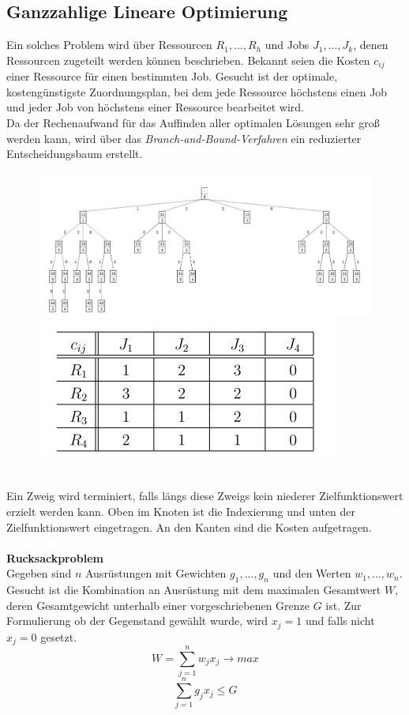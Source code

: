 	\subsection{Ganzzahlige Lineare Optimierung}
		Ein solches Problem wird über Ressourcen $ R_{1}, ...,R_{h} $ und Jobs $ J_{1}, ...,J_{k} $, denen Ressourcen zugeteilt werden können beschrieben. Bekannt seien die Kosten $ c_{ij} $ einer Ressource für einen bestimmten Job. Gesucht ist der optimale, kostengünstigste Zuordnungsplan, bei dem jede Ressource höchstens einen Job und jeder Job von höchstens einer Ressource bearbeitet wird. \\
		Da der Rechenaufwand für das Auffinden aller optimalen Lösungen sehr groß werden kann, wird über das \textit{Branch-and-Bound-Verfahren} ein reduzierter Entscheidungsbaum erstellt.
		\begin{figure}[h]
			\centering
			\includegraphics[width=0.7\linewidth]{./pics/ma/bnd} 
			\includegraphics[width=0.29\linewidth]{./pics/ma/bndt}
		\end{figure}
		\leavevmode \\
		Ein Zweig wird terminiert, falls längs diese Zweigs kein niederer Zielfunktionswert erzielt werden kann. Oben im Knoten ist die Indexierung und unten der Zielfunktionswert eingetragen. An den Kanten sind die Kosten aufgetragen.
		\leavevmode \\\\
		\textbf{Rucksackproblem}\\
		Gegeben sind $ n $ Ausrüstungen mit Gewichten $ g_{1}, ...,g_{n} $ und den Werten $ w_{1}, ..., w_{n} $. Gesucht ist die Kombination an Ausrüstung mit dem maximalen Gesamtwert $ W $, deren Gesamtgewicht unterhalb einer vorgeschriebenen Grenze $ G $ ist. Zur Formulierung ob der Gegenstand gewählt wurde, wird $ x_{j} = 1 $ und falls nicht $ x_{j} = 0 $ gesetzt.
		\[W = \sum_{j=1}^{n} w_{j}x_{j}\rightarrow max\]
		\[\sum_{j=1}^{n} g_{j}x_{j} \leq G\]
